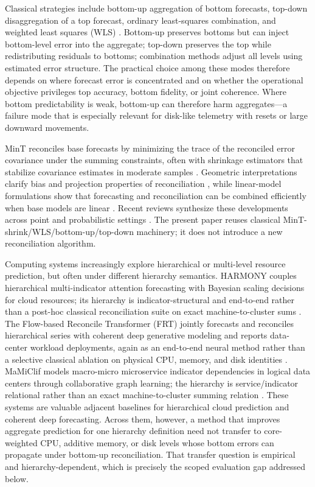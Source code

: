 \documentclass[a4paper,fleqn]{cas-dc}
\begin{document}
Classical strategies include bottom-up aggregation of bottom forecasts,
top-down disaggregation of a top forecast, ordinary least-squares combination,
and weighted least squares ({WLS})
\cite{hyndman2011optimal,athanasopoulos2024hierarchical}.
Bottom-up preserves bottoms but can inject bottom-level error into the aggregate;
top-down preserves the top while redistributing residuals to bottoms; combination
methods adjust all levels using estimated error structure.
The practical choice among these modes therefore depends on where forecast error
is concentrated and on whether the operational objective privileges top accuracy,
bottom fidelity, or joint coherence.
Where bottom predictability is weak, bottom-up can therefore harm aggregates---a
failure mode that is especially relevant for disk-like telemetry with resets or
large downward movements.

MinT reconciles base forecasts by minimizing the trace of the reconciled error
covariance under the summing constraints, often with shrinkage estimators that
stabilize covariance estimates in moderate samples
\cite{wickramasuriya2019mint,schafer2005shrinkage}.
Geometric interpretations clarify bias and projection properties of
reconciliation
\cite{panagiotelis2021geometric},
while linear-model formulations show that forecasting and reconciliation can be
combined efficiently when base models are linear
\cite{ashouri2022fast}.
Recent reviews synthesize these developments across point and probabilistic
settings
\cite{athanasopoulos2024hierarchical,panagiotelis2023probabilistic}.
The present paper reuses classical MinT-shrink/{WLS}/bottom-up/top-down
machinery; it does not introduce a new reconciliation algorithm.

Computing systems increasingly explore hierarchical or multi-level resource
prediction, but often under different hierarchy semantics.
{HARMONY} couples hierarchical multi-indicator attention forecasting with
{Bayesian} scaling decisions for cloud resources; its hierarchy is
indicator-structural and end-to-end rather than a post-hoc classical
reconciliation suite on exact machine-to-cluster sums
\cite{harmony2024}.
The Flow-based Reconcile Transformer ({FRT}) jointly forecasts and reconciles
hierarchical series with coherent deep generative modeling and reports
data-center workload deployments, again as an end-to-end neural method rather
than a selective classical ablation on physical {CPU}, memory, and disk
identities
\cite{wang2025frt}.
{MaMiClif} models macro-micro microservice indicator dependencies in logical
data centers through collaborative graph learning; the hierarchy is
service/indicator relational rather than an exact machine-to-cluster summing
relation
\cite{gao2026mamiclif}.
These systems are valuable adjacent baselines for hierarchical cloud prediction
and coherent deep forecasting.
Across them, however, a method that improves aggregate prediction for one
hierarchy definition need not transfer to core-weighted {CPU}, additive memory,
or disk levels whose bottom errors can propagate under bottom-up reconciliation.
That transfer question is empirical and hierarchy-dependent, which is precisely
the scoped evaluation gap addressed below.
\end{document}
